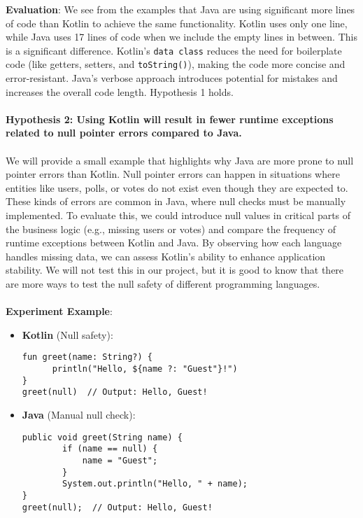 \noindent \textbf{Evaluation}: We see from the examples that Java are using significant more lines of code than Kotlin to achieve the same functionality. Kotlin uses only one line, while Java uses 17 lines of code when we include the empty lines in between. This is a significant difference. Kotlin's \texttt{data class} reduces the need for boilerplate code (like getters, setters, and \texttt{toString()}), making the code more concise and error-resistant. Java’s verbose approach introduces potential for mistakes and increases the overall code length.  Hypothesis 1 holds. 
\\
\\
\textbf{Hypothesis 2: Using Kotlin will result in fewer runtime exceptions related to null pointer errors compared to Java.} 
\\
\\ 
We will provide a small example that highlights why Java are more prone to null pointer errors than Kotlin. Null pointer errors can happen in situations where entities like users, polls, or votes do not exist even though they are expected to. These kinds of errors are common in Java, where null checks must be manually implemented. To evaluate this, we could introduce null values in critical parts of the business logic (e.g., missing users or votes) and compare the frequency of runtime exceptions between Kotlin and Java. By observing how each language handles missing data, we can assess Kotlin’s ability to enhance application stability. We will not test this in our project, but it is good to know that there are more ways to test the null safety of different programming languages.
\\
\\
\textbf{Experiment Example}:

\begin{tcolorbox}[colframe=blue!80!black, colback=blue!5!white, coltitle=blue!50!black, title={-}, boxrule=0.5mm, width=0.8\textwidth, sharp corners=south]
    \begin{itemize}
    \vspace{0.2cm}
        \item \textbf{\scriptsize Kotlin} \scriptsize (Null safety):
        \begin{lstlisting}[style=kotlin, basicstyle=\scriptsize\ttfamily]
fun greet(name: String?) {
      println("Hello, ${name ?: "Guest"}!")
}
greet(null)  // Output: Hello, Guest!
        \end{lstlisting}
        
        \item \textbf{\scriptsize Java} \scriptsize (Manual null check):
        \begin{lstlisting}[style=java, basicstyle=\scriptsize\ttfamily]
public void greet(String name) {
        if (name == null) {
            name = "Guest";
        }
        System.out.println("Hello, " + name);
}
greet(null);  // Output: Hello, Guest!
        \end{lstlisting}
    \end{itemize}
\end{tcolorbox}

